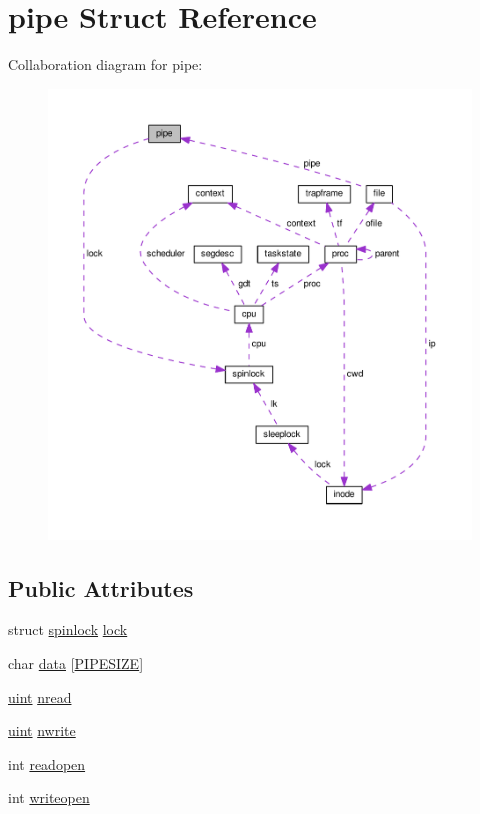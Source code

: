 \hypertarget{structpipe}{}\section{pipe Struct Reference}
\label{structpipe}


Collaboration diagram for pipe\+:\nopagebreak
\begin{figure}[H]
\begin{center}
\leavevmode
\includegraphics[width=350pt]{df/d8e/structpipe__coll__graph}
\end{center}
\end{figure}
\subsection*{Public Attributes}
\begin{DoxyCompactItemize}
\item 
struct \hyperlink{structspinlock}{spinlock} \hyperlink{structpipe_a0ce399a2ba316d11cb8e678069bfd5b4}{lock}
\item 
char \hyperlink{structpipe_ab02ae9fa0b8b092512c28c7c080f0c7b}{data} \mbox{[}\hyperlink{pipe_8c_ad3dc9214a710d7a6c516cbaa2a12a1de}{P\+I\+P\+E\+S\+I\+ZE}\mbox{]}
\item 
\hyperlink{types_8h_a91ad9478d81a7aaf2593e8d9c3d06a14}{uint} \hyperlink{structpipe_ad71eb56c445f9178dac07ae47f352fd1}{nread}
\item 
\hyperlink{types_8h_a91ad9478d81a7aaf2593e8d9c3d06a14}{uint} \hyperlink{structpipe_a419b6fc2780013358de51c91371dac66}{nwrite}
\item 
int \hyperlink{structpipe_a7bdc57b39ef97dda61e468ad9e8dbfba}{readopen}
\item 
int \hyperlink{structpipe_a9538da698ddd63615c991a318094663b}{writeopen}
\end{DoxyCompactItemize}


